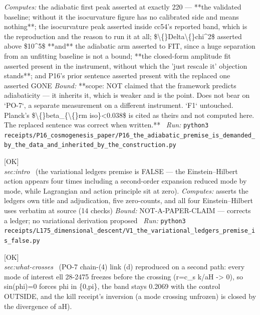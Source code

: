 \begin{description}
\emph{Computes:} the adiabatic first peak asserted at exactly 220 --- **the validated baseline; without it the isocurvature figure has no calibrated side and means nothing**; the isocurvature peak asserted inside cc54's reported band, which is the reproduction and the reason to run it at all; \$\textbackslash\{\}Delta\textbackslash\{\}chi\textasciicircum{}2\$ asserted above \$10\textasciicircum{}5\$ **and** the adiabatic arm asserted to FIT, since a huge separation from an unfitting baseline is not a bound; **the closed-form amplitude fit asserted present in the instrument, without which the 'just rescale it' objection stands**; and P16's prior sentence asserted present with the replaced one asserted GONE
 \emph{Bound:} **scope: NOT claimed that the framework predicts adiabaticity --- it inherits it, which is weaker and is the point. Does not bear on `PO-7`, a separate measurement on a different instrument. `F1` untouched. Planck's \$\textbackslash\{\}beta\_\{\textbackslash\{\}rm iso\}<0.038\$ is cited as theirs and not computed here. The replaced sentence was correct when written.**
\ \emph{Run:} \texttt{python3 receipts/P16\_cosmogenesis\_paper/P16\_the\_adiabatic\_premise\_is\_demanded\_by\_the\_data\_and\_inherited\_by\_the\_construction.py}
\item[\label{rcpt:V1_the_variational_ledgers_premise_is_false}\texttt{V1\_the\_variational\_ledgers\_premise\_is\_false}]\hfill\textsf{[OK]}\\
\textit{sec:intro} \ (the variational ledgers premise is FALSE --- the Einstein--Hilbert action appears four times including a second-order expansion reduced mode by mode, while Lagrangian and action principle sit at zero). 
\emph{Computes:} asserts the ledgers own title and adjudication, five zero-counts, and all four Einstein--Hilbert uses verbatim at source (14 checks)
 \emph{Bound:} NOT-A-PAPER-CLAIM --- corrects a ledger; no variational derivation proposed
\ \emph{Run:} \texttt{python3 receipts/L175\_dimensional\_descent/V1\_the\_variational\_ledgers\_premise\_is\_false.py}
\item[\label{rcpt:S1_every_mode_of_interest_freezes_and_the_inversion_is_closed}\texttt{S1\_every\_mode\_of\_interest\_freezes\_and\_the\_inversion\_is\_closed}]\hfill\textsf{[OK]}\\
\textit{sec:what-crosses} \ (PO-7 chain-(4) link (d) reproduced on a second path: every mode of interest ell 28-2475 freezes before the crossing (r=c\_s k/\textbar{}aH\textbar{} -> 0), so sin(phi)=0 forces phi in \{0,pi\}, the band stays 0.2069 with the control OUTSIDE, and the kill receipt's inversion (a mode crossing unfrozen) is closed by the divergence of \textbar{}aH\textbar{}). 

\end{description}
